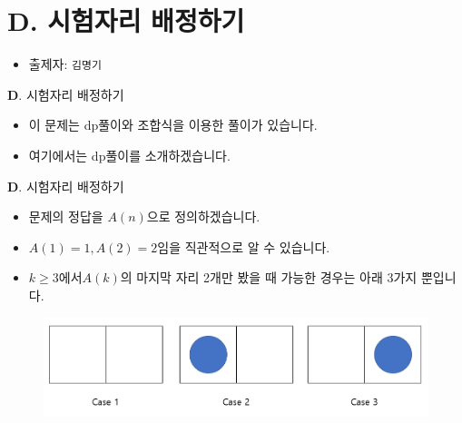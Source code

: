 \section{D. 시험자리 배정하기}

\begin{frame} %
    \begin{itemize}
        \item 출제자: \texttt{김명기}
    \end{itemize}
\end{frame}

\begin{frame}{\textbf{D}. 시험자리 배정하기}

    \begin{itemize}
    	\item 이 문제는 dp풀이와 조합식을 이용한 풀이가 있습니다.
    	\item 여기에서는 dp풀이를 소개하겠습니다.
    \end{itemize}
    
\end{frame}


\begin{frame}{\textbf{D}. 시험자리 배정하기}
	
	\begin{itemize}
		\item 문제의 정답을 $A(n)$으로 정의하겠습니다.
		\item $A(1) = 1, A(2) = 2$임을 직관적으로 알 수 있습니다.
		\item $k \ge 3$에서$A(k)$의 마지막 자리 2개만 봤을 때 가능한 경우는 아래 3가지 뿐입니다.

	\end{itemize}
	\begin{figure}[h!]
		\centering
		\includegraphics[width=0.7\linewidth]{../images/set-examseats/1.png}
	\end{figure}
\end{frame}

